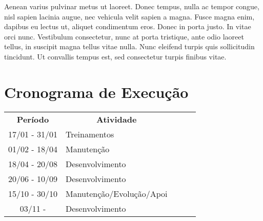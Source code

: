Aenean varius pulvinar metus ut laoreet. Donec tempus, nulla ac tempor congue, nisl sapien lacinia augue, nec vehicula velit sapien a magna. Fusce magna enim, dapibus eu lectus ut, aliquet condimentum eros. Donec in porta justo. In vitae orci nunc. Vestibulum consectetur, nunc at porta tristique, ante odio laoreet tellus, in suscipit magna tellus vitae nulla. Nunc eleifend turpis quis sollicitudin tincidunt. Ut convallis tempus est, sed consectetur turpis finibus vitae.




\section{Cronograma de Execução}
\pagebreak

\begin{table}[]
\begin{tabular}{|c|l|lll}
\cline{1-2}
\textbf{Período} & \multicolumn{1}{c|}{\textbf{Atividade}}                            &  &  &  \\ \cline{1-2}
17/01 - 31/01    & Treinamentos                              &  &  &  \\ \cline{1-2}
01/02 - 18/04    & Manutenção                       &  &  &  \\ \cline{1-2}
18/04 - 20/08    & Desenvolvimento                             &  &  &  \\ \cline{1-2}
20/06 - 10/09    & Desenvolvimento  &  &  &  \\ \cline{1-2}
15/10 - 30/10    & Manutenção/Evolução/Apoi       &  &  &  \\ \cline{1-2}
03/11 -          & Desenvolvimento                     &  &  &  \\ \cline{1-2}
\end{tabular}
\end{table}
